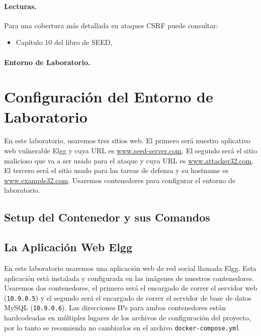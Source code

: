 \paragraph{Lecturas.}
Para una cobertura más detallada en ataques CSRF puede consultar:

\begin{itemize}
\item Capítulo 10 del libro de SEED, \seedbook
\end{itemize}


\paragraph{Entorno de Laboratorio.} 
\seedenvironmentB 
\nodependency



\section{Configuración del Entorno de Laboratorio}

En este laboratorio, usaremos tres sitios web.
El primero será nuestro aplicativo web vulnerable Elgg y cuya URL es \url{www.seed-server.com}. El segundo será el sitio malicioso que va a ser usado para el ataque y cuya URL es \url{www.attacker32.com}. El tercero será el sitio usado para las tareas de defensa y su hostname es \url{www.example32.com}.
Usaremos contenedores para configurar el entorno de laboratorio.

\subsection{Setup del Contenedor y sus Comandos}





\subsection{La Aplicación Web Elgg}

En este laboratorio usaremos una aplicación web de red social llamada Elgg.
Esta aplicación está instalada y configurada en las imágenes de nuestros contenedores. 
Usaremos dos contenedores, el primero será el encargado de correr el servidor web  (\texttt{10.9.0.5}) y el segundo será el encargado de correr el servidor de base de datos MySQL (\texttt{10.9.0.6}). 
Las direcciones IPs para ambos contenedores están hardcodeadas en múltiples lugares de los archivos de configuración del proyecto, por lo tanto se recomienda no cambiarlos en el archivo \texttt{docker-compose.yml}

